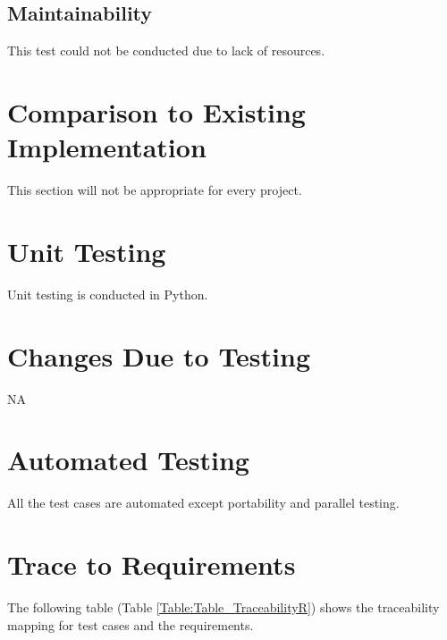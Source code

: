 \documentclass[12pt, titlepage]{article}
\begin{document}
\subsection{Maintainability}

This test could not be conducted due to lack of resources.

	
\section{Comparison to Existing Implementation}	

This section will not be appropriate for every project.

\section{Unit Testing} Unit testing is conducted in Python.

\section{Changes Due to Testing} NA

\section{Automated Testing} All the test cases are automated except 
portability and parallel testing.
		
\section{Trace to Requirements} 


The following table (Table \ref{Table:Table_TraceabilityR}) shows the 
traceability mapping for test cases and the 
requirements. 
\end{document}

